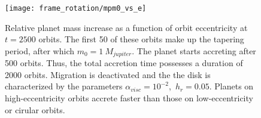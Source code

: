         \begin{figure}[h!]
          \centering
          \texttt{[image: frame\_rotation/mpm0\_vs\_e]}
          \caption{
            Relative planet mass increase as a function of orbit 
            eccentricity at $t=2500$ orbits. The first 50 of these orbits make 
            up the tapering period, after which $m_0=1\ M_{jupiter}$. The 
            planet starts accreting after 500 orbits. Thus, the total accretion 
            time possesses a duration of 2000 orbits. Migration is
            deactivated and the the disk is characterized by the parameters 
            $\alpha_{visc}=10^{-2}$,\ $h_r=0.05$.
            Planets on high-eccentricity orbits accrete faster than those 
            on low-eccentricity or cirular orbits.
          }
          \label{fig:rel_mass_increase_after_2550_orbits_vs_ecc}
        \end{figure}


